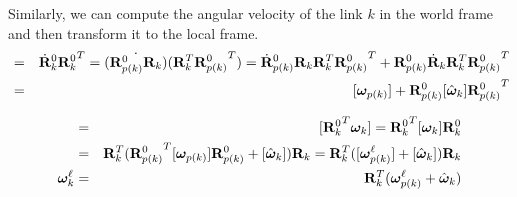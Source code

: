 Similarly, we can compute the angular velocity of the link $k$ in the
world frame and then transform it to the local frame.
\begin{eqnarray}
[\bm{\omega}_k] &=& \dot{\vc{R}}^0_{k} {\vc{R}^0_k}^T =
(\dot{\vc{R}^0_{p(k)} \vc{R}_k}) (\vc{R}_k^T {\vc{R}^0_{p(k)}}^T) =
\dot{\vc{R}}^0_{p(k)} \vc{R}_k \vc{R}_k^T {\vc{R}^0_{p(k)}}^T +
\vc{R}^0_{p(k)} \dot{\vc{R}}_k \vc{R}_k^T {\vc{R}^0_{p(k)}}^T
\nonumber \\
&=& [\bm{\omega}_{p(k)}] + \vc{R}^0_{p(k)} [\hat{\bm{\omega}}_k ] {\vc{R}^0_{p(k)}}^T
\end{eqnarray}

\begin{eqnarray}
[\bm{\omega}_k^\ell] &=& [{\vc{R}^0_k}^T \bm{\omega}_k] = {\vc{R}^0_k}^T
[\bm{\omega}_k] \vc{R}^0_k \nonumber \\
&=& \vc{R}_k^T ({\vc{R}^0_{p(k)}}^T [\bm{\omega}_{p(k)}] \vc{R}^0_{p(k)}
+ [\hat{\bm{\omega}}_k]) \vc{R}_k = \vc{R}_k^T
([\bm{\omega}_{p(k)}^\ell] + [\hat{\bm{\omega}}_k]) \vc{R}_k \nonumber \\
\bm{\omega}_k^\ell &=& \vc{R}_k^T
(\bm{\omega}_{p(k)}^\ell + \hat{\bm{\omega}}_k)
\end{eqnarray}

